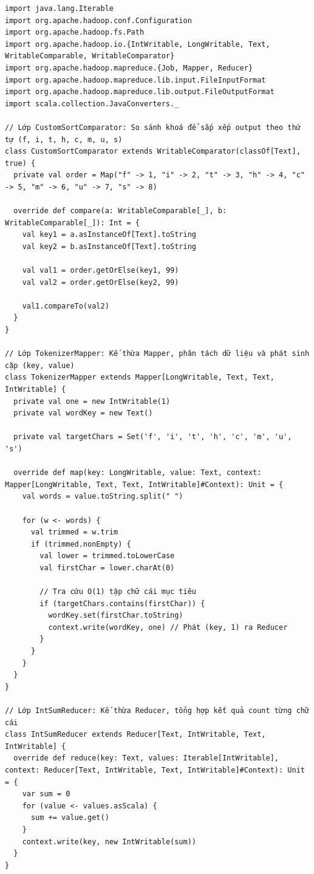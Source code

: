 \begin{verbatim}
import java.lang.Iterable
import org.apache.hadoop.conf.Configuration
import org.apache.hadoop.fs.Path
import org.apache.hadoop.io.{IntWritable, LongWritable, Text, WritableComparable, WritableComparator}
import org.apache.hadoop.mapreduce.{Job, Mapper, Reducer}
import org.apache.hadoop.mapreduce.lib.input.FileInputFormat
import org.apache.hadoop.mapreduce.lib.output.FileOutputFormat
import scala.collection.JavaConverters._

// Lớp CustomSortComparator: So sánh khoá để sắp xếp output theo thứ tự (f, i, t, h, c, m, u, s)
class CustomSortComparator extends WritableComparator(classOf[Text], true) {
  private val order = Map("f" -> 1, "i" -> 2, "t" -> 3, "h" -> 4, "c" -> 5, "m" -> 6, "u" -> 7, "s" -> 8)

  override def compare(a: WritableComparable[_], b: WritableComparable[_]): Int = {
    val key1 = a.asInstanceOf[Text].toString
    val key2 = b.asInstanceOf[Text].toString

    val val1 = order.getOrElse(key1, 99)
    val val2 = order.getOrElse(key2, 99)

    val1.compareTo(val2)
  }
}

// Lớp TokenizerMapper: Kế thừa Mapper, phân tách dữ liệu và phát sinh cặp (key, value)
class TokenizerMapper extends Mapper[LongWritable, Text, Text, IntWritable] {
  private val one = new IntWritable(1)
  private val wordKey = new Text()

  private val targetChars = Set('f', 'i', 't', 'h', 'c', 'm', 'u', 's')

  override def map(key: LongWritable, value: Text, context: Mapper[LongWritable, Text, Text, IntWritable]#Context): Unit = {
    val words = value.toString.split(" ")

    for (w <- words) {
      val trimmed = w.trim
      if (trimmed.nonEmpty) {
        val lower = trimmed.toLowerCase
        val firstChar = lower.charAt(0)

        // Tra cứu O(1) tập chữ cái mục tiêu
        if (targetChars.contains(firstChar)) {
          wordKey.set(firstChar.toString)
          context.write(wordKey, one) // Phát (key, 1) ra Reducer
        }
      }
    }
  }
}

// Lớp IntSumReducer: Kế thừa Reducer, tổng hợp kết quả count từng chữ cái
class IntSumReducer extends Reducer[Text, IntWritable, Text, IntWritable] {
  override def reduce(key: Text, values: Iterable[IntWritable], context: Reducer[Text, IntWritable, Text, IntWritable]#Context): Unit = {
    var sum = 0
    for (value <- values.asScala) {
      sum += value.get()
    }
    context.write(key, new IntWritable(sum))
  }
}


\end{verbatim}
